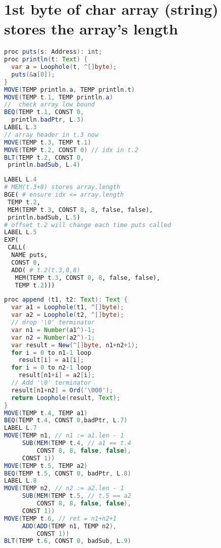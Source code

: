 \section*{1st byte of char array (string) stores the array's length}
\begin{minipage}{.45\linewidth}
\begin{lstlisting}[language=Java,frame=none,
morekeywords={proc,var,to,loop,Text,Ord,Address,Number,Loophole,}]
proc puts(s: Address): int;
proc println(t: Text) {
  var a = Loophole(t, ^[]byte);
  puts(&a[0]);
}
MOVE(TEMP println.a, TEMP println.t)
MOVE(TEMP t.1, TEMP println.a)
//  check array low bound
BEQ(TEMP t.1, CONST 0,
  println.badPtr, L.3)
LABEL L.3
// array header in t.3 now
MOVE(TEMP t.3, TEMP t.1)
MOVE(TEMP t.2, CONST 0) // idx in t.2
BLT(TEMP t.2, CONST 0,
 println.badSub, L.4)
\end{lstlisting}
\end{minipage}
\begin{minipage}{.6\linewidth}
\begin{lstlisting}[language=Python,frame=none,xleftmargin=-1em]
LABEL L.4
# MEM(t.3+8) stores array.length
BGE( # ensure idx <= array.length
 TEMP t.2,
 MEM(TEMP t.3, CONST 8, 8, false, false),
 println.badSub, L.5)
# offset t.2 will change each time puts called
LABEL L.5
EXP(
 CALL(
  NAME puts,
  CONST 0,
  ADD( # t.2(t.3,0,8)
   MEM(TEMP t.3, CONST 0, 8, false, false),
   TEMP t.2)))
\end{lstlisting}
\end{minipage}
\begin{minipage}{.45\linewidth}
\begin{lstlisting}[language=Java,morekeywords={Number,var,to,loop,Ord,Loophole},
frame=none,xleftmargin=-1em]
  proc append (t1, t2: Text): Text {
  var a1 = Loophole(t1, ^[]byte);
  var a2 = Loophole(t2, ^[]byte);
  // drop '\0' terminator
  var n1 = Number(a1^)-1;
  var n2 = Number(a2^)-1;
  var result = New(^[]byte, n1+n2+1);
  for i = 0 to n1-1 loop
    result[i] = a1[i];
  for i = 0 to n2-1 loop
    result[n1+i] = a2[i];
  // Add '\0' terminator
  result[n1+n2] = Ord('\000');
  return Loophole(result, Text);
}
MOVE(TEMP t.4, TEMP a1)
BEQ(TEMP t.4, CONST 0,badPtr, L.7)
LABEL L.7
MOVE(TEMP n1, // n1 := a1.len - 1
     SUB(MEM(TEMP t.4, // a1 == t.4
         CONST 8, 8, false, false),
     CONST 1))
MOVE(TEMP t.5, TEMP a2)
BEQ(TEMP t.5, CONST 0, badPtr, L.8)
LABEL L.8
MOVE(TEMP n2, // n2 := a2.len - 1
     SUB(MEM(TEMP t.5, // t.5 == a2
         CONST 8, 8, false, false),
     CONST 1))
MOVE(TEMP t.6, // ret = n1+n2+1
     ADD(ADD(TEMP n1, TEMP n2),
         CONST 1))
BLT(TEMP t.6, CONST 0, badSub, L.9)
\end{lstlisting}
\end{minipage}
